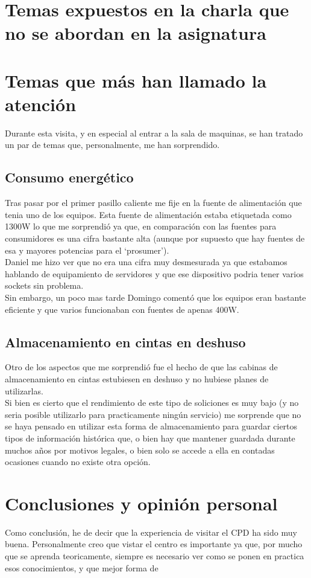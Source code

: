 \documentclass[a4paper,11pt]{article}
\begin{document}
\section{Temas expuestos en la charla que no se abordan en la asignatura}

\section{Temas que más han llamado la atención}
Durante esta visita, y en especial al entrar a la sala de maquinas, se han tratado un par de temas que, personalmente, me han sorprendido.
\subsection{Consumo energético}
Tras pasar por el primer pasillo caliente me fije en la fuente de alimentación que tenia uno de los equipos. Esta fuente de alimentación estaba etiquetada como 1300W lo que me sorprendió ya que, en comparación con las fuentes para consumidores es una cifra bastante alta (aunque por supuesto que hay fuentes de esa y mayores potencias para el `prosumer').\\Daniel me hizo ver que no era una cifra muy desmesurada ya que estabamos hablando de equipamiento de servidores y que ese dispositivo podria tener varios sockets sin problema.\\
Sin embargo, un poco mas tarde Domingo comentó que los equipos eran bastante eficiente y que varios funcionaban con fuentes de apenas 400W.

\subsection{Almacenamiento en cintas en deshuso}
Otro de los aspectos que me sorprendió fue el hecho de que las cabinas de almacenamiento en cintas estubiesen en deshuso y no hubiese planes de utilizarlas.\\
Si bien es cierto que el rendimiento de este tipo de soliciones es muy bajo (y no seria posible utilizarlo para practicamente ningún servicio) me sorprende que no se haya pensado en utilizar esta forma de almacenamiento para guardar ciertos tipos de información histórica que, o bien hay que mantener guardada durante muchos años por motivos legales, o bien solo se accede a ella en contadas ocasiones cuando no existe otra opción.

\section{Conclusiones y opinión personal}
Como conclusión, he de decir que la experiencia de visitar el CPD ha sido muy buena. Personalmente creo que vistar el centro es importante ya que, por mucho que se aprenda teoricamente, siempre es necesario ver como se ponen en practica esos conocimientos, y que mejor forma de


\begin{thebibliography}{99}
\end{thebibliography}
\end{document}
